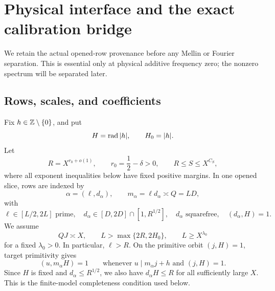 \section{Physical interface and the exact calibration bridge}
\label{sec:tpc27-interface-bridge}

We retain the actual opened-row provenance before any Mellin or Fourier
separation.  This is essential only at physical additive frequency
zero; the nonzero spectrum will be separated later.

\subsection{Rows, scales, and coefficients}

Fix \(h\in\mathbb Z\setminus\{0\}\), and put
\begin{equation}
 H=\operatorname{rad}|h|,
 \qquad H_0=|h|.
 \label{eq:tpc27-H-H0}
\end{equation}
Let
\begin{equation}
 R=X^{r_0+o(1)},
 \qquad r_0=\frac12-\delta>0,
 \qquad R\le S\le X^{C_S},
 \label{eq:tpc27-RS}
\end{equation}
where all exponent inequalities below have fixed positive margins.  In
one opened slice, rows are indexed by
\begin{equation}
 \alpha=(\ell,d_\alpha),
 \qquad m_\alpha=\ell d_\alpha\asymp Q=LD,
 \label{eq:tpc27-row-index}
\end{equation}
with
\begin{equation}
 \ell\in[L/2,2L]\text{ prime},
 \quad d_\alpha\in[D,2D]\cap[1,R^{1/2}],
 \quad d_\alpha\text{ squarefree},
 \quad(d_\alpha,H)=1.
 \label{eq:tpc27-row-support}
\end{equation}
We assume
\begin{equation}
 QJ\asymp X,
 \qquad L>\max\{2R,2H_0\},
 \qquad L\ge X^{\lambda_0}
 \label{eq:tpc27-row-scales}
\end{equation}
for a fixed \(\lambda_0>0\).  In particular, \(\ell>R\).  On the
primitive orbit \((j,H)=1\), target primitivity gives
\begin{equation}
 (u,m_\alpha H)=1
 \qquad\text{whenever }u\mid m_\alpha j+h
 \text{ and }(j,H)=1.
 \label{eq:tpc27-target-primitivity}
\end{equation}
Since \(H\) is fixed and \(d_\alpha\le R^{1/2}\), we also have
\(d_\alpha H\le R\) for all sufficiently large \(X\).  This is the
finite-model completeness condition used below.

